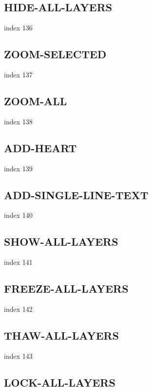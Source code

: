 \documentclass[a4paper]{report}
\begin{document}
\subsection{HIDE-ALL-LAYERS}

index 136

\subsection{ZOOM-SELECTED}

index 137

\subsection{ZOOM-ALL}

index 138

\subsection{ADD-HEART}

index 139

\subsection{ADD-SINGLE-LINE-TEXT}

index 140

\subsection{SHOW-ALL-LAYERS}

index 141

\subsection{FREEZE-ALL-LAYERS}

index 142

\subsection{THAW-ALL-LAYERS}

index 143

\subsection{LOCK-ALL-LAYERS}
\end{document}
